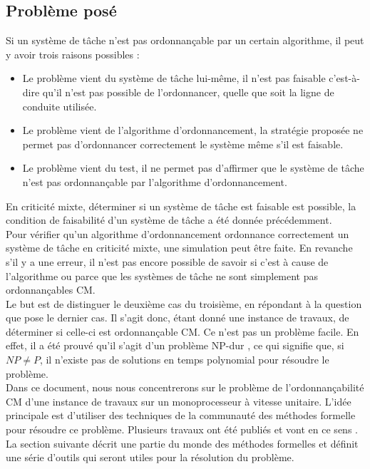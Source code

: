 \documentclass[11pt,a4paper,oneside]{book}
\theoremstyle{break}
\theoremstyle{breakplain}
\begin{document}
\subsection{Problème posé}
Si un système de tâche n'est pas ordonnançable par un certain algorithme, il peut y avoir trois raisons possibles \cite{bakerbrute} :
\begin{itemize}
\item Le problème vient du système de tâche lui-même, il n'est pas faisable c'est-à-dire qu'il n'est pas possible de l'ordonnancer, quelle que soit la ligne de conduite utilisée.
\item Le problème vient de l'algorithme d'ordonnancement, la stratégie proposée ne permet pas d'ordonnancer correctement le système même s'il est faisable.
\item Le problème vient du test, il ne permet pas d'affirmer que le système de tâche n'est pas ordonnançable par l'algorithme d'ordonnancement.
\end{itemize}

En criticité mixte, déterminer si un système de tâche est faisable est possible, la condition de faisabilité d'un système de tâche a été donnée précédemment.\\

Pour vérifier qu'un algorithme d'ordonnancement ordonnance  correctement un système de tâche en criticité mixte, une simulation peut être faite. En revanche s'il y a une erreur, il n'est pas encore possible de savoir si c'est à cause de l'algorithme ou parce que les systèmes de tâche ne sont simplement pas ordonnançables CM.\\

Le but est de distinguer le deuxième cas du troisième, en répondant à la question que pose le dernier cas. Il s'agit donc, étant donné une instance de travaux, de déterminer si celle-ci est ordonnançable CM. Ce n'est pas un problème facile. En effet, il a été prouvé qu'il s'agit d'un problème NP-dur \cite{baruah2009mixed}, ce qui signifie que, si $NP \neq P$, il n'existe pas de solutions en temps polynomial pour résoudre le problème.\\

Dans ce document, nous nous concentrerons sur le problème de l'ordonnançabilité CM d'une instance de travaux sur un monoprocesseur à vitesse unitaire. L'idée principale est d'utiliser des techniques de la communauté des méthodes formelle pour résoudre ce problème. Plusieurs travaux ont été publiés et vont en ce sens \cite{geeraerts2013multiprocessor} \cite{bakerbrute}.\\
La section suivante décrit une partie du monde des méthodes formelles et définit une série d'outils qui seront utiles pour la résolution du problème.
\end{document}
